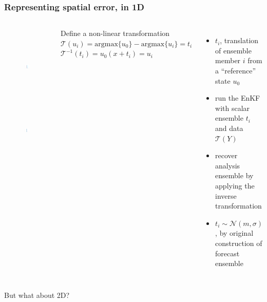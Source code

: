 \documentclass{beamer}
\begin{document}
\begin{frame}
\frametitle{Representing spatial error, in 1D}

\begin{columns}%
%
\vspace{-.5in}
\begin{figure}[h]
\includegraphics[height=1.25in]{eps/tprior}\\
\vspace{.05in}
\includegraphics[height=1.25in]{eps/tenkfmorph}
\end{figure}
\vspace{-.2in}
\begin{block}{Define a non-linear transformation}
$\mathcal{T}(u_i)=\mbox{argmax}\{u_0\}-\mbox{argmax}\{u_i\}=t_i$\\
$\mathcal{T}^{-1}(t_i)=u_0(x+t_i)=u_i$
\end{block}
\begin{itemize}
\item
$t_i$, translation of ensemble member $i$ from a ``reference'' state $u_0$
\item
run the EnKF with scalar ensemble $t_i$ and data $\mathcal{T}(Y)$
\item
recover analysis ensemble by applying the inverse transformation
\item
$t_i\sim \mathcal{N}(m,\sigma)$, by original construction of forecast ensemble
\end{itemize}
\end{columns}
\begin{center}But what about 2D?\end{center}
\end{frame}
\end{document}

